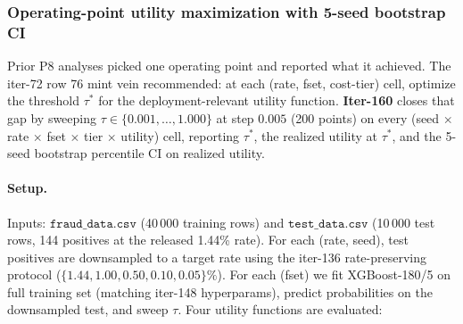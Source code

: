 %
%

\subsubsection{Operating-point utility maximization with 5-seed bootstrap CI}
\label{sec:p8-iter160}

Prior P8 analyses picked one operating point and reported what it achieved.
The iter-72 row 76 mint vein recommended: at each (rate, fset, cost-tier)
cell, optimize the threshold $\tau^*$ for the deployment-relevant utility
function. \textbf{Iter-160} closes that gap by sweeping $\tau \in
\{0.001,\ldots,1.000\}$ at step $0.005$ (200 points) on every
(seed $\times$ rate $\times$ fset $\times$ tier $\times$ utility) cell,
reporting $\tau^*$, the realized utility at $\tau^*$, and the 5-seed
bootstrap percentile CI on realized utility.

\paragraph{Setup.}
Inputs: $\mathtt{fraud\_data.csv}$ (40\,000 training rows) and
$\mathtt{test\_data.csv}$ (10\,000 test rows, 144 positives at the
released 1.44\% rate). For each (rate, seed), test positives are
downsampled to a target rate using the iter-136 rate-preserving protocol
($\{1.44, 1.00, 0.50, 0.10, 0.05\}\%$). For each (fset) we fit
XGBoost-180/5 on full training set (matching iter-148 hyperparams), predict
probabilities on the downsampled test, and sweep $\tau$. Four utility
functions are evaluated:

